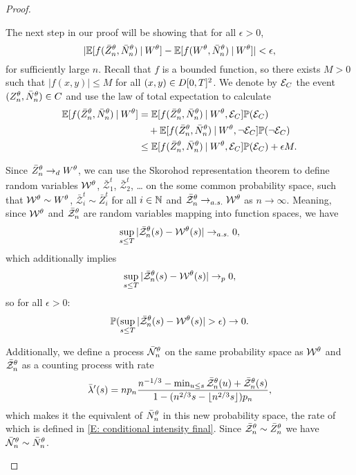 \begin{proof}
\begin{proofpart}
The next step in our proof will be showing that for all $\epsilon > 0$,
\begin{equation}
|\mathbb{E}[ f(\bar{Z}^{\theta}_n, \bar{N}_n^{\theta}) \: | \: W^{\theta}] - \mathbb{E}[f(W^{\theta}, \bar{N}_n^{\theta}) \: | \: W^{\theta}]| < \epsilon,
\end{equation}
for sufficiently large $n$.
Recall that $f$ is a bounded function, so there exists $M>0$ such that $|f(x,y)| \leq M$ for all $(x,y) \in D[0, T]^2$.
We denote by $\mathcal{E}_{C}$ the event $(Z_n^{\theta}, \bar{N}_n^{\theta}) \in C$ and use the law of total expectation to calculate
\begin{equation} \label{E: Estimation step 1}
\begin{aligned}
\mathbb{E}[ f(\bar{Z}^{\theta}_n, \bar{N}_n^{\theta}) \: | \: W^{\theta}] 
&= \mathbb{E}[f(\bar{Z}^{\theta}_n, \bar{N}_n^{\theta}) \: | \: W^{\theta}, \mathcal{E}_{C}] \mathbb{P}(\mathcal{E}_{C}) \\
&\quad + \mathbb{E}[f(\bar{Z}^{\theta}_n, \bar{N}_n^{\theta}) \: | \: W^{\theta}, \neg\mathcal{E}_{C}] \mathbb{P}(\neg\mathcal{E}_{C}) \\
&\leq \mathbb{E}[f(\bar{Z}^{\theta}_n, \bar{N}_n^{\theta}) \: | \: W^{\theta}, \mathcal{E}_{C}]\mathbb{P}(\mathcal{E}_{C}) + \epsilon M.
\end{aligned}
\end{equation}

Since $\bar{Z}^{\theta}_n \rightarrow_d W^{\theta}$, we can use the Skorohod representation theorem to define random variables 
$\mathcal{W}^{\theta}$, $\bar{\mathcal{Z}}^t_1$, $\bar{\mathcal{Z}}^t_2$, \dots
on the some common probability space, such that $\mathcal{W}^{\theta} \sim W^{\theta}$, $\bar{\mathcal{Z}}^t_i \sim \bar{Z}^t_i$ for all $i \in \mathbb{N}$
and $\bar{\mathcal{Z}}^{\theta}_n \rightarrow_{a.s.} \mathcal{W}^{\theta}$ as $n \rightarrow \infty$.
Meaning, since $\mathcal{W}^{\theta}$ and $\bar{\mathcal{Z}}^{\theta}_n$ are random variables mapping into function spaces, we have
\begin{equation}
\sup_{s \leq T} |\bar{\mathcal{Z}}^{\theta}_n(s) - \mathcal{W}^{\theta}(s)| \rightarrow_{a.s.} 0,
\end{equation}
which additionally implies
\begin{equation} 
\sup_{s \leq T} |\bar{\mathcal{Z}}^{\theta}_n(s) - \mathcal{W}^{\theta}(s)| \rightarrow_p 0,
\end{equation}
so for all $\epsilon > 0$:
\begin{equation} \label{E: Prob(Event(delta)) 1}
\mathbb{P}( \sup_{s \leq T} |\bar{\mathcal{Z}}^{\theta}_n(s) - \mathcal{W}^{\theta}(s)| > \epsilon ) \rightarrow 0.
\end{equation}

Additionally, we define a process $\bar{\mathcal{N}}_n^{\theta}$ on the same probability space as $\mathcal{W}^{\theta}$ and $\bar{\mathcal{Z}}^{\theta}_n$ as a counting process with rate
\begin{equation}
\bar{\lambda}'(s) = n p_n \frac{n^{-1 / 3} - \min_{u \leq s} \bar{\mathcal{Z}}^{\theta}_n(u) + \bar{\mathcal{Z}}^{\theta}_n(s)}{1 - (n^{2 / 3}s - \lfloor n^{2 / 3}s\rfloor)p_n},
\end{equation}
which makes it the equivalent of $\bar{N}_n^{\theta}$ in this new probability space, the rate of which is defined in \eqref{E: conditional intensity final}.
Since $\bar{\mathcal{Z}}^{\theta}_n \sim \bar{Z}^{\theta}_n$ we have $\bar{\mathcal{N}}_n^{\theta} \sim \bar{N}_n^{\theta}$.


\end{proofpart}
\end{proof}
